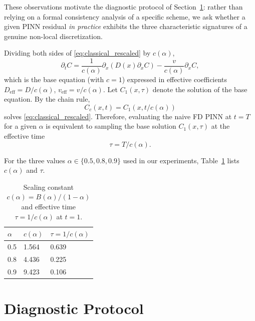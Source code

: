 \documentclass[11pt]{article}
\begin{document}
These observations motivate the diagnostic protocol of
Section~\ref{sec:protocol}: rather than relying on a formal
consistency analysis of a specific scheme, we ask whether a given
PINN residual \emph{in practice} exhibits the three characteristic
signatures of a genuine non-local discretization.

Dividing both sides of \eqref{eq:classical_rescaled} by \(c(\alpha)\),
\begin{equation}
\partial_t C = \frac{1}{c(\alpha)}\partial_x(D(x)\partial_x C) - \frac{v}{c(\alpha)}\partial_x C,
\end{equation}
which is the base equation (with \(c=1\)) expressed in effective coefficients \(D_{\mathrm{eff}} = D/c(\alpha)\), \(v_{\mathrm{eff}} = v/c(\alpha)\). Let \(C_1(x,\tau)\) denote the solution of the base equation. By the chain rule,
\begin{equation}
C_c(x,t) = C_1\!\left(x, t/c(\alpha)\right)
\label{eq:eff_time}
\end{equation}
solves \eqref{eq:classical_rescaled}. Therefore, evaluating the naive FD PINN at \(t=T\) for a given \(\alpha\) is equivalent to sampling the base solution \(C_1(x,\tau)\) at the effective time
\begin{equation}
\tau = T/c(\alpha).
\label{eq:tau}
\end{equation}

For the three values \(\alpha \in \{0.5, 0.8, 0.9\}\) used in our experiments, Table~\ref{tab:tau} lists \(c(\alpha)\) and \(\tau\).

\begin{table}[h]
\centering
\caption{Scaling constant \(c(\alpha) = B(\alpha)/(1-\alpha)\) and effective time \(\tau = 1/c(\alpha)\) at \(t=1\).}
\label{tab:tau}
\begin{tabular}{lll}
\toprule
\(\alpha\) & \(c(\alpha)\) & \(\tau = 1/c(\alpha)\) \\
\midrule
0.5 & 1.564 & 0.639 \\
0.8 & 4.436 & 0.225 \\
0.9 & 9.423 & 0.106 \\
\bottomrule
\end{tabular}
\end{table}

\section{Diagnostic Protocol}
\label{sec:protocol}
\end{document}
